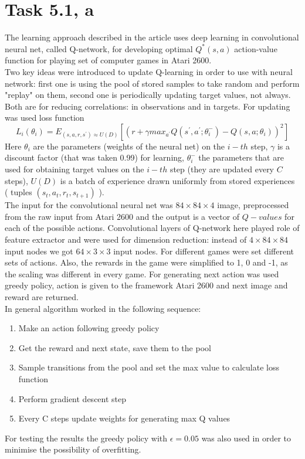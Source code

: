 \documentclass[english]{scrartcl}
\begin{document}
\section*{Task 5.1, a}
The learning approach described in the article uses deep learning in convolutional neural net, called Q-network, for developing optimal $Q^{*}(s,a)$ action-value function for playing set of computer games in Atari 2600. 
\\Two key ideas were introduced to update Q-learning in order to use with neural network: first one is using the pool of stored samples to take random and perform "replay" on them, second one is periodically updating target values, not always. Both are for reducing correlations: in observations and in targets. For updating was used loss function $$L_{i}(\theta_{i})=E_{(s,a,r,s^{\prime})\approx U(D)}[(r+\gamma max_{a^{\prime}} Q(s^{\prime},a^{\prime};\theta_{i}^{-})-Q(s,a;\theta_{i}))^{2}]$$
Here $\theta_{i}$ are the parameters (weights of the neural net) on the $i-th$ step, $\gamma$ is a discount factor (that was taken 0.99) for learning, $\theta_{i}^{-}$ the parameters that are used for obtaining target values on the $i-th$ step (they are updated every $C$ steps), $U(D)$ is a batch of experience drawn uniformly from stored experiences ( tuples $(s_{t},a_{t},r_{t},s_{t+1})$ ). 
\\The input for the convolutional neural net was $84\times84\times4$ image, preprocessed from the raw input from Atari 2600 and the output is a vector of $Q-values$ for each of the possible actions. Convolutional layers of Q-network here played role of feature extractor and were used for dimension reduction: instead of $4\times 84\times 84$ input nodes we got $64\times 3\times 3$ input nodes. For different games were set different sets of actions. Also, the rewards in the game were simplified to 1, 0 and -1, as the scaling was different in every game. For generating next action was used greedy policy, action is given to the framework Atari 2600 and next image and reward are returned. 
\\In general algorithm worked in the following sequence:
\begin{enumerate}
\item Make an action following greedy policy
\item Get the reward and next state, save them to the pool
\item Sample transitions from the pool and set the max value to calculate loss function
\item Perform gradient descent step
\item Every C steps update weights for generating max Q values
\end{enumerate}
For testing the results the greedy policy with $\epsilon = 0.05$ was also used in order to minimise the possibility of overfitting.
\end{document}

